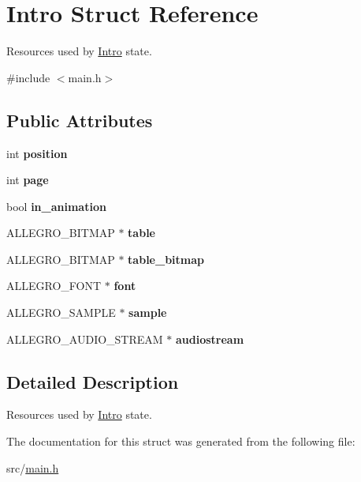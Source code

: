 \hypertarget{structIntro}{\section{\-Intro \-Struct \-Reference}
\label{structIntro}
}


\-Resources used by \hyperlink{structIntro}{\-Intro} state.  




{\ttfamily \#include $<$main.\-h$>$}

\subsection*{\-Public \-Attributes}
\begin{DoxyCompactItemize}
\item 
\hypertarget{structIntro_a5c266b2590d4304f92fd3bad033f4375}{int {\bfseries position}}\label{structIntro_a5c266b2590d4304f92fd3bad033f4375}

\item 
\hypertarget{structIntro_aaea1b2d24c0c9a5437c59d727c79ebd1}{int {\bfseries page}}\label{structIntro_aaea1b2d24c0c9a5437c59d727c79ebd1}

\item 
\hypertarget{structIntro_a2876fd8a7bfd940c3936eb6445984a22}{bool {\bfseries in\-\_\-animation}}\label{structIntro_a2876fd8a7bfd940c3936eb6445984a22}

\item 
\hypertarget{structIntro_a342227f3940dba9ed6b5d3bb4579fd48}{\-A\-L\-L\-E\-G\-R\-O\-\_\-\-B\-I\-T\-M\-A\-P $\ast$ {\bfseries table}}\label{structIntro_a342227f3940dba9ed6b5d3bb4579fd48}

\item 
\hypertarget{structIntro_a77ea358d1f44d69e5477f5dedfc9fd2b}{\-A\-L\-L\-E\-G\-R\-O\-\_\-\-B\-I\-T\-M\-A\-P $\ast$ {\bfseries table\-\_\-bitmap}}\label{structIntro_a77ea358d1f44d69e5477f5dedfc9fd2b}

\item 
\hypertarget{structIntro_a896d4fdd74cf47535173eeaa6e81f734}{\-A\-L\-L\-E\-G\-R\-O\-\_\-\-F\-O\-N\-T $\ast$ {\bfseries font}}\label{structIntro_a896d4fdd74cf47535173eeaa6e81f734}

\item 
\hypertarget{structIntro_a0189475d44f8e19e6fe543371a9daedb}{\-A\-L\-L\-E\-G\-R\-O\-\_\-\-S\-A\-M\-P\-L\-E $\ast$ {\bfseries sample}}\label{structIntro_a0189475d44f8e19e6fe543371a9daedb}

\item 
\hypertarget{structIntro_a879aa48597b2f7b6fbeb9f9911234350}{\-A\-L\-L\-E\-G\-R\-O\-\_\-\-A\-U\-D\-I\-O\-\_\-\-S\-T\-R\-E\-A\-M $\ast$ {\bfseries audiostream}}\label{structIntro_a879aa48597b2f7b6fbeb9f9911234350}

\end{DoxyCompactItemize}


\subsection{\-Detailed \-Description}
\-Resources used by \hyperlink{structIntro}{\-Intro} state. 

\-The documentation for this struct was generated from the following file\-:\begin{DoxyCompactItemize}
\item 
src/\hyperlink{main_8h}{main.\-h}\end{DoxyCompactItemize}
